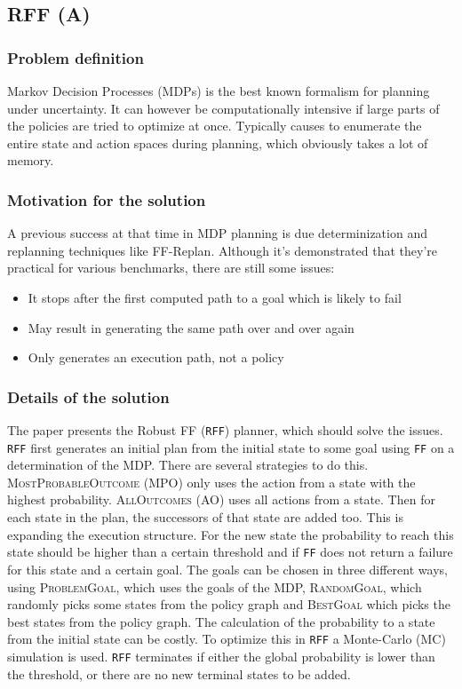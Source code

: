 \documentclass[runningheads,a4paper]{llncs}
\begin{document}
\subsection{RFF (A)}

\subsubsection{Problem definition}

Markov Decision Processes (MDPs) is the best known formalism for planning under
uncertainty. It can however be computationally intensive if large parts of the
policies are tried to optimize at once. Typically causes to enumerate the
entire state and action spaces during planning, which obviously takes a lot of
memory.

\subsubsection{Motivation for the solution}

A previous success at that time in MDP planning is due determinization and
replanning techniques like FF-Replan. Although it's demonstrated that they're
practical for various benchmarks, there are still some issues:

\begin{itemize}
	\item It stops after the first computed path to a goal which is likely to fail
	\item May result in generating the same path over and over again
	\item Only generates an execution path, not a policy
\end{itemize}



\subsubsection{Details of the solution}

The paper presents the Robust FF (\texttt{RFF}) planner, which should solve the
issues. \texttt{RFF} first generates an initial plan from the initial state to
some goal using \texttt{FF} on a determination of the MDP\@. There are several
strategies to do this. \textsc{MostProbableOutcome} (MPO) only uses the action
from a state with the highest probability. \textsc{AllOutcomes} (AO) uses all
actions from a state. Then for each state in the plan, the successors of that
state are added too. This is expanding the execution structure. For the new
state the probability to reach this state should be higher than a certain
threshold and if \texttt{FF} does not return a failure for this state and a
certain goal. The goals can be chosen in three different ways, using
\textsc{ProblemGoal}, which uses the goals of the MDP, \textsc{RandomGoal},
which randomly picks some states from the policy graph and \textsc{BestGoal}
which picks the best states from the policy graph. The calculation of the
probability to a state from the initial state can be costly. To optimize this
in \texttt{RFF} a Monte-Carlo (MC) simulation is used. \texttt{RFF} terminates
if either the global probability is lower than the threshold, or there are no
new terminal states to be added.
\end{document}
